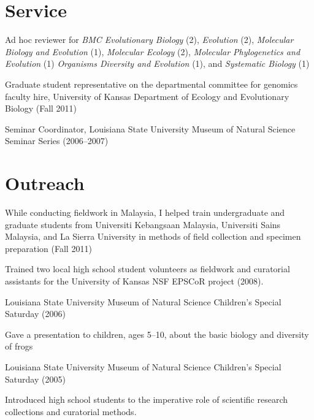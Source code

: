 \section*{Service}
\begin{myItemize}
\item Ad hoc reviewer for
    \emph{BMC Evolutionary Biology} (2),
    \emph{Evolution} (2),
    \emph{Molecular Biology and Evolution} (1),
    \emph{Molecular Ecology} (2),
    \emph{Molecular Phylogenetics and Evolution} (1)
    \emph{Organisms Diversity and Evolution} (1), and
    \emph{Systematic Biology} (1)
\item Graduate student representative on the departmental committee for
    genomics faculty hire, University of Kansas Department of Ecology and
    Evolutionary Biology (Fall 2011)
\item Seminar Coordinator, Louisiana State University Museum of Natural Science
    Seminar Series (2006--2007)
\end{myItemize}

\section*{Outreach}
\begin{myItemize}
\item While conducting fieldwork in Malaysia, I helped train undergraduate and
    graduate students from Universiti Kebangsaan Malaysia, Universiti Sains
    Malaysia, and La Sierra University in methods of field collection and
    specimen preparation (Fall 2011)
\item Trained two local high school student volunteers as fieldwork and
    curatorial assistants for the University of Kansas NSF EPSCoR project
    (2008).
\item Louisiana State University Museum of Natural Science Children's Special
    Saturday (2006)
    \begin{myItemize}
        \item Gave a presentation to children, ages 5--10, about the basic
            biology and diversity of frogs
    \end{myItemize}
\item Louisiana State University Museum of Natural Science Children's Special
    Saturday (2005)
    \begin{myItemize}
        \item Introduced high school students to the imperative role of
            scientific research collections and curatorial methods.
    \end{myItemize}
\end{myItemize}

